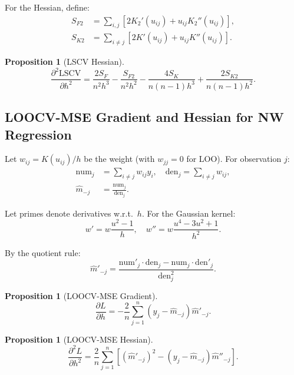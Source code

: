 \documentclass[11pt]{article}
\newtheorem{proposition}[theorem]{Proposition}
\theoremstyle{definition}
\theoremstyle{remark}
\begin{document}
For the Hessian, define:
\begin{align}
    S_{F2} &= \sum_{i,j} \left[ 2 K_2'(u_{ij}) + u_{ij} K_2''(u_{ij}) \right], \\
    S_{K2} &= \sum_{i \neq j} \left[ 2 K'(u_{ij}) + u_{ij} K''(u_{ij}) \right].
\end{align}

\begin{proposition}[LSCV Hessian]
\begin{equation}
    \frac{\partial^2 \mathrm{LSCV}}{\partial h^2} = \frac{2 S_F}{n^2 h^3} - \frac{S_{F2}}{n^2 h^2} - \frac{4 S_K}{n(n-1) h^3} + \frac{2 S_{K2}}{n(n-1) h^2}.
\end{equation}
\end{proposition}

\subsection{LOOCV-MSE Gradient and Hessian for NW Regression}

Let $w_{ij} = K(u_{ij})/h$ be the weight (with $w_{jj} = 0$ for LOO). For observation $j$:
\begin{align}
    \text{num}_j &= \sum_{i \neq j} w_{ij} y_i, \quad
    \text{den}_j = \sum_{i \neq j} w_{ij}, \\
    \hat{m}_{-j} &= \frac{\text{num}_j}{\text{den}_j}.
\end{align}

Let primes denote derivatives w.r.t.\ $h$. For the Gaussian kernel:
\begin{equation}
    w' = w \frac{u^2 - 1}{h}, \quad
    w'' = w \frac{u^4 - 3u^2 + 1}{h^2}.
\end{equation}

By the quotient rule:
\begin{equation}
    \hat{m}'_{-j} = \frac{\text{num}'_j \cdot \text{den}_j - \text{num}_j \cdot \text{den}'_j}{\text{den}_j^2}.
\end{equation}

\begin{proposition}[LOOCV-MSE Gradient]
\begin{equation}
    \frac{\partial L}{\partial h} = -\frac{2}{n} \sum_{j=1}^{n} (y_j - \hat{m}_{-j}) \hat{m}'_{-j}.
\end{equation}
\end{proposition}

\begin{proposition}[LOOCV-MSE Hessian]
\begin{equation}
    \frac{\partial^2 L}{\partial h^2} = \frac{2}{n} \sum_{j=1}^{n} \left[ (\hat{m}'_{-j})^2 - (y_j - \hat{m}_{-j}) \hat{m}''_{-j} \right].
\end{equation}
\end{proposition}
\end{document}

